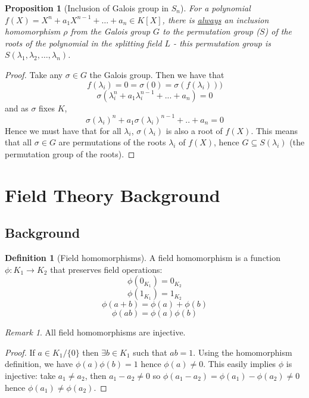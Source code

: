 \documentclass{article}
\theoremstyle{definition}
\newtheorem{defn}{Definition}[section]
\theoremstyle{plain}%
\newtheorem{prop}[thm]{Proposition}
\theoremstyle{remark}
\newtheorem*{rem}{Remark}
\begin{document}
\begin{prop}[Inclusion of Galois group in $S_n$]\label{Galois incl prop}
For a polynomial $f(X) = X^n + a_1X^{n-1} + \dots + a_n \in K[X]$, there is \underline{always} an inclusion homomorphism $\rho$ from the Galois group $G$ to the permutation group ($S$) of the roots of the polynomial in the splitting field $L$ - this permutation group is $S(\lambda_1, \lambda_2, \dots, \lambda_n)$.
\end{prop}

\begin{proof}
Take any $\sigma \in G$ the Galois group. Then we have that \[f(\lambda_i) = 0 = \sigma(0) = \sigma(f(\lambda_i)))\] \[\sigma(\lambda_i^n + a_1\lambda_i^{n-1} + ... + a_n) = 0\] and as $\sigma$ fixes $K$, \[\sigma(\lambda_i)^n + a_1\sigma(\lambda_i)^{n-1} + .. + a_n = 0\] Hence we must have that for all $\lambda_i$, $\sigma(\lambda_i)$ is also a root of $f(X)$. This means that all $\sigma \in G$ are permutations of the roots $\lambda_i$ of $f(X)$, hence $G \subseteq S(\lambda_i)$ (the permutation group of the roots).
\end{proof}



\section{Field Theory Background}

\subsection{Background}

\begin{defn}[Field homomorphisms]
A field homomorphism is a function $\phi: K_1 \to K_2$ that preserves field operations: \[\phi(0_{K_1}) = 0_{K_2}\] \[\phi(1_{K_1}) = 1_{K_2}\] \[\phi(a+b) = \phi(a) + \phi(b) \] \[\phi(ab) = \phi(a)\phi(b)\]
\end{defn}

\begin{rem}
All field homomorphisms are injective.
\end{rem}

\begin{proof}
If $a \in K_1 / \{0\}$ then $\exists b \in K_1$ such that $ab = 1$. Using the homomorphism definition, we have $\phi(a)\phi(b) = 1$ hence $\phi(a) \ne 0$. This easily implies $\phi$ is injective: take $a_1 \ne a_2$, then $a_1 - a_2 \ne 0$ so $\phi(a_1 - a_2) = \phi(a_1) - \phi(a_2) \ne 0$ hence $\phi(a_1) \ne \phi(a_2)$.
\end{proof}
\end{document}
